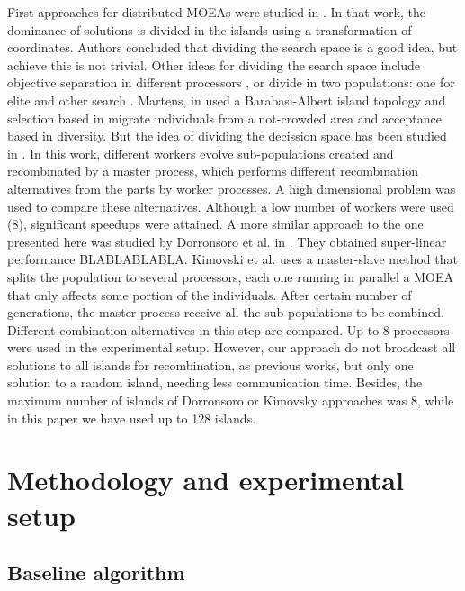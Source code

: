 \documentclass[runningheads,a4paper]{llncs}
\begin{document}
First approaches for distributed MOEAs were studied in \cite{Deb03distributed}. In that work, the dominance of solutions is divided in the islands using a transformation of coordinates. Authors concluded that dividing the search space is a good idea, but achieve this is not trivial. Other ideas for dividing the search space include objective separation in different processors \cite{Xiao03specialized}, or divide in two populations: one for elite and other search  \cite{Wang09parallel}. Martens, in \cite{Martens13asynchronous} used a Barabasi-Albert island topology and selection based in migrate individuals from a not-crowded area and acceptance based in diversity. But the idea of dividing the decission space has been studied in \cite{Kimovski15Parallel}. In this work, different workers evolve sub-populations created and recombinated by a master process, which performs different recombination alternatives from the parts by worker processes. A high dimensional problem was used to compare these alternatives. Although a low number of workers were used (8), significant speedups were attained. A more similar approach to the one presented here was studied by Dorronsoro et al. in \cite{Dorronsoro13superlinear}. They obtained super-linear performance BLABLABLABLA. Kimovski et al. \cite{Kimovski15Parallel} uses a master-slave method that splits the population to several processors, each one running in parallel a MOEA that only affects some portion of the individuals. After certain number of generations, the master process receive all the sub-populations to be combined. Different combination alternatives in this step are compared. Up to 8 processors were used in the experimental setup. However, our approach do not broadcast all solutions to all islands for recombination, as previous works, but only one solution to a random island, needing less communication time. Besides, the maximum number of islands of Dorronsoro or Kimovsky approaches was 8, while in this paper we have used up to 128 islands.




%
%
\section{Methodology and experimental setup}
\label{sec:met}




\subsection{Baseline algorithm}
\end{document}
